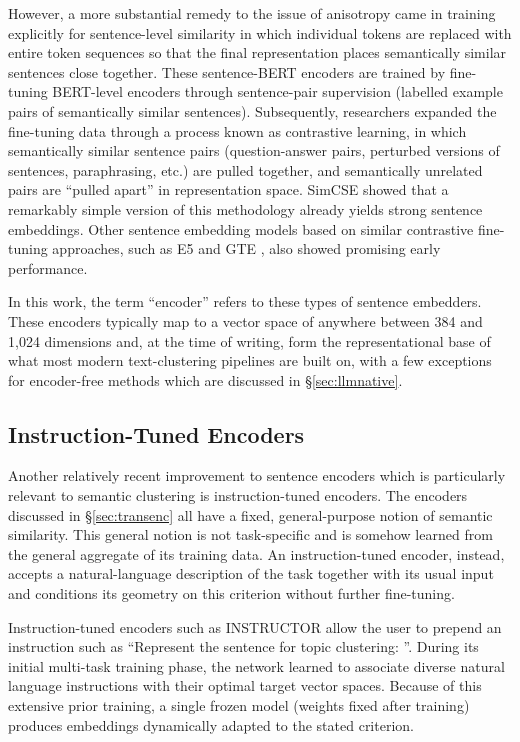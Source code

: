 \documentclass[11pt,a4paper,oneside]{report}
\begin{document}
However, a more substantial remedy to the issue of anisotropy came in training explicitly for sentence-level similarity in which individual tokens are replaced with entire token sequences so that the final representation places semantically similar sentences close together. These sentence-BERT \citep{reimers2019sbert} encoders are trained by fine-tuning BERT-level encoders through sentence-pair supervision (labelled example pairs of semantically similar sentences). Subsequently, researchers expanded the fine-tuning data through a process known as contrastive learning, in which semantically similar sentence pairs (question-answer pairs, perturbed versions of sentences, paraphrasing, etc.) are pulled together, and semantically unrelated pairs are ``pulled apart'' in representation space. SimCSE  \citep{gao2021simcse} showed that a remarkably simple version of this methodology already yields strong sentence embeddings. Other sentence embedding models based on similar contrastive fine-tuning approaches, such as E5 \citep{wang2022e5} and GTE \citep{li2023gte}, also showed promising early performance.

In this work, the term ``encoder'' refers to these types of sentence embedders. These encoders typically map to a vector space of anywhere between 384 and 1{,}024 dimensions and, at the time of writing, form the representational base of what most modern text-clustering pipelines are built on, with a few exceptions for encoder-free methods which are discussed in \S\ref{sec:llmnative}.

\subsection{Instruction-Tuned Encoders}

Another relatively recent improvement to sentence encoders which is particularly relevant to semantic clustering is instruction-tuned encoders. The encoders discussed in \S\ref{sec:transenc} all have a fixed, general-purpose notion of semantic similarity. This general notion is not task-specific and is somehow learned from the general aggregate of its training data. An instruction-tuned encoder, instead, accepts a natural-language description of the task together with its usual input and conditions its geometry on this criterion without further fine-tuning.

Instruction-tuned encoders such as INSTRUCTOR \citep{su2023instructor} allow the user to prepend an instruction such as ``Represent the sentence for topic clustering: ''. During its initial multi-task training phase, the network learned to associate diverse natural language instructions with their optimal target vector spaces. Because of this extensive prior training, a single frozen model (weights fixed after training) produces embeddings dynamically adapted to the stated criterion.
\end{document}
